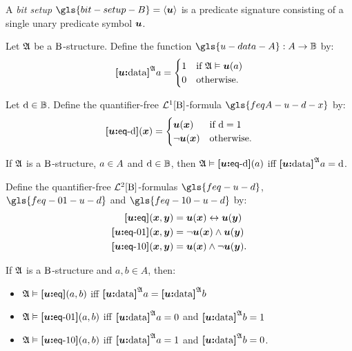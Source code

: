 A \emph{bit setup} $\gls{bit-setup-B} = \seq{\su}$ is a predicate signature
consisting of a single unary predicate symbol $\su$.

\begin{definition}
Let $\StrA$ be a $\BS$-structure.
Define the function $\gls{u-data-A} : \domA \to \Bits$ by:
\[
  \data\su\StrA a = \begin{cases}
    1 &\text{if } \StrA \vDash \su(a) \\
    0 &\text{otherwise.}
  \end{cases}
\]
\end{definition}
\begin{definition}
Let $\datad \in \Bits$. Define the quantifier-free $\vFoF1\BS$-formula
$\gls{feqA-u-d-x}$ by:
\[
  \feqA\su\datad(\xx) = \begin{cases}
    \su(\xx) &\text{if } \datad = 1 \\
    \lnot\su(\xx) &\text{otherwise.}
  \end{cases}
\]
\end{definition}
If $\StrA$ is a $\BS$-structure, $\ea \in \domA$ and $\datad \in \Bits$,
then $\StrA \vDash \feqA\su\datad(\ea)$ iff $\data\su\StrA\ea = \datad$.

\begin{definition}
Define the quantifier-free $\vFoF2\BS$-formulas 
$\gls{feq-u-d}$, $\gls{feq-01-u-d}$ and $\gls{feq-10-u-d}$ by:
\begin{align*}
  \feq\su(\xx,\yy) &= \su(\xx) \lequ \su(\yy) \\
  \feqOI\su(\xx,\yy) &= \lnot \su(\xx) \land \su(\yy) \\
  \feqIO\su(\xx,\yy) &= \su(\xx) \land \lnot \su(\yy). \\
\end{align*}
\end{definition}
If $\StrA$ is a $\BS$-structure and $a, b \in A$, then:
\begin{itemize}
  \item $\StrA \vDash \feq\su(a, b)$ iff $\data\su\StrA a = \data\su\StrA b$
  \item $\StrA \vDash \feqOI\su(a, b)$ iff $\data\su\StrA a = 0$ and
  $\data\su\StrA b = 1$
  \item $\StrA \vDash \feqIO\su(a, b)$ iff $\data\su\StrA a = 1$ and
  $\data\su\StrA b = 0$.
\end{itemize}